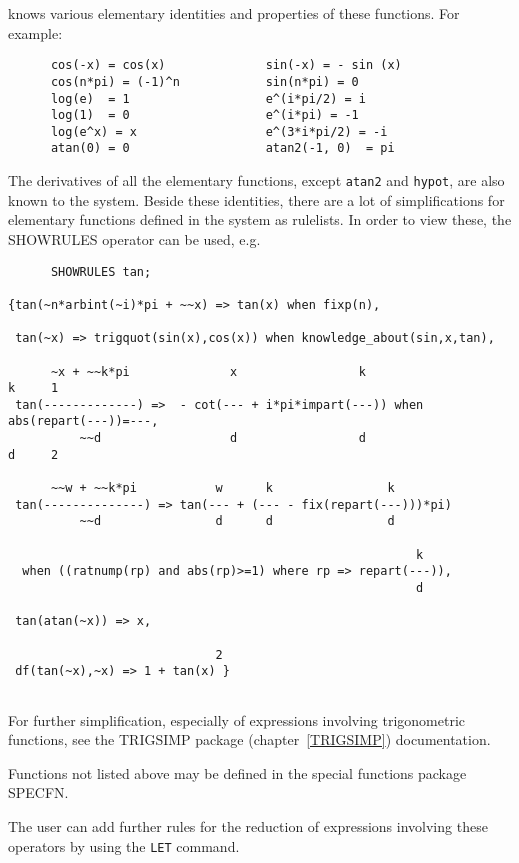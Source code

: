 {\REDUCE} knows various elementary identities and properties
of these functions. For example:
\begin{verbatim}
      cos(-x) = cos(x)              sin(-x) = - sin (x)
      cos(n*pi) = (-1)^n            sin(n*pi) = 0
      log(e)  = 1                   e^(i*pi/2) = i
      log(1)  = 0                   e^(i*pi) = -1
      log(e^x) = x                  e^(3*i*pi/2) = -i
      atan(0) = 0                   atan2(-1, 0)  = pi
\end{verbatim}

The derivatives of all the elementary  functions, except \texttt{atan2} and \texttt{hypot}, are also known to the system.
Beside these identities, there are a lot of simplifications
for elementary functions
defined in the {\REDUCE} system as rulelists. In order to
view these, the SHOWRULES operator can be used, e.g.

\begin{verbatim}
      SHOWRULES tan;

{tan(~n*arbint(~i)*pi + ~~x) => tan(x) when fixp(n),

 tan(~x) => trigquot(sin(x),cos(x)) when knowledge_about(sin,x,tan),

      ~x + ~~k*pi              x                 k                     k     1
 tan(-------------) =>  - cot(--- + i*pi*impart(---)) when abs(repart(---))=---,
          ~~d                  d                 d                     d     2

      ~~w + ~~k*pi           w      k                k
 tan(--------------) => tan(--- + (--- - fix(repart(---)))*pi)
          ~~d                d      d                d

                                                         k
  when ((ratnump(rp) and abs(rp)>=1) where rp => repart(---)),
                                                         d

 tan(atan(~x)) => x,

                             2
 df(tan(~x),~x) => 1 + tan(x) }
			      
\end{verbatim}

For further simplification, especially of expressions involving
trigonometric functions, see the TRIGSIMP package
(chapter~\ref{TRIGSIMP}) documentation.

Functions not listed above may be defined in the special functions
package SPECFN.

The user can add further rules for the reduction of expressions involving
these operators by using the \texttt{LET} command.

